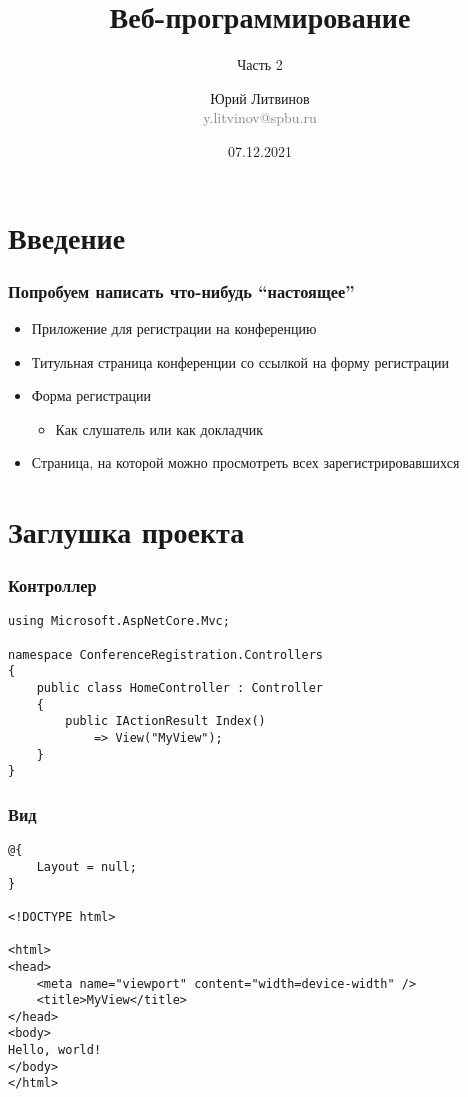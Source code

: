 \documentclass[xetex,mathserif,serif]{beamer}
\title{Веб-программирование}
\subtitle{Часть 2}
\author[Юрий Литвинов]{Юрий Литвинов\\\small{\textcolor{gray}{y.litvinov@spbu.ru}}}
\date{07.12.2021}
\begin{document}
    \frame{\titlepage}

    \section{Введение}

    \begin{frame}
        \frametitle{Попробуем написать что-нибудь ``настоящее''}
        \begin{itemize}
            \item Приложение для регистрации на конференцию
            \item Титульная страница конференции со ссылкой на форму регистрации
            \item Форма регистрации
            \begin{itemize}
                \item Как слушатель или как докладчик
            \end{itemize}
            \item Страница, на которой можно просмотреть всех зарегистрировавшихся
        \end{itemize}
    \end{frame}

    \section{Заглушка проекта}

    \begin{frame}[fragile]
        \frametitle{Контроллер}
        \begin{verbatim}
using Microsoft.AspNetCore.Mvc;

namespace ConferenceRegistration.Controllers
{
    public class HomeController : Controller
    {
        public IActionResult Index()
            => View("MyView");
    }
}
        \end{verbatim}
    \end{frame}

    \begin{frame}[fragile]
        \frametitle{Вид}
        \begin{verbatim}
@{
    Layout = null;
}

<!DOCTYPE html>

<html>
<head>
    <meta name="viewport" content="width=device-width" />
    <title>MyView</title>
</head>
<body>
Hello, world!
</body>
</html>
        \end{verbatim}
    \end{frame}
\end{document}
